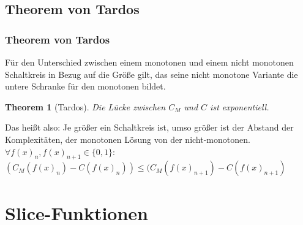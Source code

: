 \documentclass[hyperref={pdfpagelabels=false}]{beamer} %
\newtheorem{thm}{Theorem}
\begin{document}
  \subsection{Theorem von Tardos}
  \begin{frame}
    \frametitle{Theorem von Tardos}
    Für den Unterschied zwischen einem monotonen und einem nicht monotonen Schaltkreis in Bezug auf die Größe gilt, das seine nicht monotone Variante die untere Schranke für den monotonen bildet.
    \begin{thm}[Tardos]
      Die Lücke zwischen $C_{M}$ und $C$ ist exponentiell.
    \end{thm}
    Das heißt also: Je größer ein Schaltkreis ist, umso größer ist der Abstand der Komplexit\"aten, der monotonen Lösung von der nicht-monotonen.\\
    $\forall f(x)_n, f(x)_{n+1} \in \{0,1\}:$\\$(C_M(f(x)_n) - C(f(x)_n)) \leq (C_M(f(x)_{n+1}) - C(f(x)_{n+1})$
  \end{frame}

  \section{Slice-Funktionen}
\end{document}
